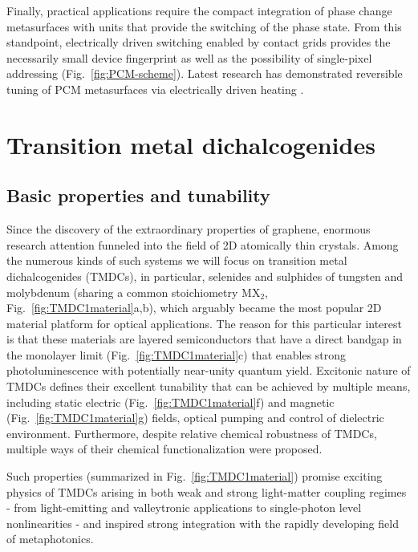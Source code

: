 \documentclass[journal=chreay,manuscript=review]{achemso}
\begin{document}
Finally, practical applications require the compact integration of phase change metasurfaces with units that provide the switching of the phase state. From this standpoint, electrically driven switching enabled by contact grids provides the necessarily small device fingerprint as well as the possibility of single-pixel addressing (Fig.~\ref{fig:PCM-scheme}). Latest research has demonstrated reversible tuning of PCM metasurfaces via electrically driven heating \cite{wang2021electrical, zhang2021electrically}.

\section{Transition metal dichalcogenides}

\subsection{Basic properties and tunability}

Since the discovery of the extraordinary properties of graphene, enormous research attention funneled into the field of 2D atomically thin crystals\cite{dai2020artificial}. Among the numerous kinds of such systems we will focus on transition metal dichalcogenides (TMDCs), in particular, selenides and sulphides of tungsten and molybdenum (sharing a common stoichiometry MX$_2$, Fig.~\ref{fig:TMDC1material}a,b), which arguably became the most popular 2D material platform for optical applications. The reason for this particular interest is that these materials are layered semiconductors that have a direct bandgap in the monolayer limit (Fig.~\ref{fig:TMDC1material}c)\cite{splendiani2010emerging, mak2016photonics} that enables strong photoluminescence with potentially near-unity quantum yield\cite{amani2015near, lien2019electrical}. Excitonic nature of TMDCs defines their excellent tunability that can be achieved by multiple means, including static electric\cite{ross2013electrical} (Fig.~\ref{fig:TMDC1material}f) and magnetic\cite{li2014valley} (Fig.~\ref{fig:TMDC1material}g) fields, optical pumping\cite{barachati2018interacting,kravtsov2020nonlinear} and control of dielectric environment\cite{raja2017coulomb}. Furthermore, despite relative chemical robustness of TMDCs, multiple ways of their chemical functionalization were proposed\cite{chen2016functionalization}.

Such properties (summarized in Fig.~\ref{fig:TMDC1material}) promise exciting physics of TMDCs arising in both weak and strong light-matter coupling regimes - from light-emitting and valleytronic applications to single-photon level nonlinearities - and inspired strong integration with the rapidly developing field of metaphotonics\cite{krasnok2018nanophotonics}. 
\end{document}
